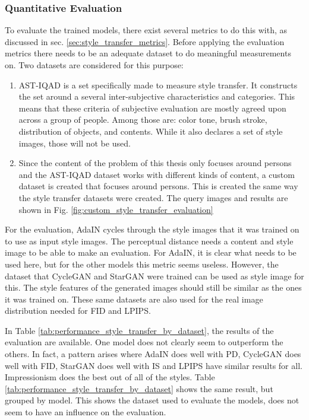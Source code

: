 \subsubsection{Quantitative Evaluation}
To evaluate the trained models, there exist several metrics to do this with, as discussed in sec. \ref{sec:style_transfer_metrics}.
Before applying the evaluation metrics there needs to be an adequate dataset to do meaningful measurements on.
Two datasets are considered for this purpose:
\begin{enumerate}
    \item \gls{AST-IQAD} is a set specifically made to measure style transfer. \cite{Chen2023}
    It constructs the set around a several inter-subjective characteristics and categories.
    This means that these criteria of subjective evaluation are mostly agreed upon across a group of people.
    Among those are: color tone, brush stroke, distribution of objects, and contents.
    While it also declares a set of style images, those will not be used.
    \item Since the content of the problem of this thesis only focuses around persons and the \gls{AST-IQAD} dataset works with different kinds of content, a custom dataset is created that focuses around persons.
    This is created the same way the style transfer datasets were created.
    The query images and results are shown in Fig. \ref{fig:custom_style_transfer_evaluation}
\end{enumerate}
For the evaluation, AdaIN cycles through the style images that it was trained on to use as input style images.
The perceptual distance needs a content and style image to be able to make an evaluation.
For AdaIN, it is clear what needs to be used here, but for the other models this metric seems useless.
However, the dataset that CycleGAN and StarGAN were trained can be used as style image for this.
The style features of the generated images should still be similar as the ones it was trained on.
These same datasets are also used for the real image distribution needed for \gls{FID} and \gls{LPIPS}.

In Table \ref{tab:performance_style_transfer_by_dataset}, the results of the evaluation are available.
One model does not clearly seem to outperform the others.
In fact, a pattern arises where AdaIN does well with \gls{PD}, CycleGAN does well with \gls{FID}, StarGAN does well with \gls{IS} and \gls{LPIPS} have similar results for all.
Impressionism does the best out of all of the styles.
Table \ref{tab:performance_style_transfer_by_dataset} shows the same result, but grouped by model.
This shows the dataset used to evaluate the models, does not seem to have an influence on the evaluation.

